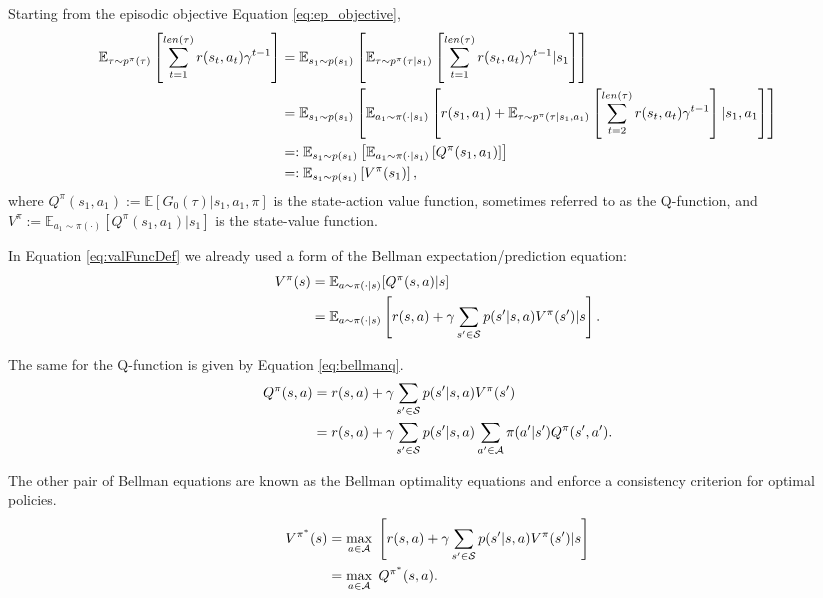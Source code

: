 \documentclass{report}
\numberwithin{equation}{section}
\numberwithin{figure}{section}
\numberwithin{table}{section}
\numberwithin{algorithm}{section}
\begin{document}
Starting from the episodic objective Equation \ref{eq:ep_objective},
\begin{align}\label{eq:valFuncDef}
  \mathbb{E}_{\tau\sim p^{\pi}(\tau)}\left[\sum_{t=1}^{len(\tau)}r(s_t, a_t)\gamma^{t-1}\right]
  &=\mathbb{E}_{s_1\sim p(s_1)}\left[\mathbb{E}_{\tau\sim p^{\pi}(\tau|s_1)}\left[\sum_{t=1}^{len(\tau)}r(s_t, a_t)\gamma^{t-1}|s_1\right]\right]\notag\\
  &=\mathbb{E}_{s_1\sim p(s_1)}\left[
      \mathbb{E}_{a_1\sim \pi(\cdot|s_1)}\left[
          r(s_1, a_1) + 
          \mathbb{E}_{\tau\sim p^{\pi}(\tau|s_1,a_1)}\left[\sum_{t=2}^{len(\tau)}r(s_t, a_t)\gamma^{t-1}\right]|s_1,a_1
        \right]
    \right]\notag\\
  &=:\mathbb{E}_{s_1\sim p(s_1)}\left[
      \mathbb{E}_{a_1\sim \pi(\cdot|s_1)}\left[Q^{\pi}(s_1,a_1)\right]
      \right]\notag\\
      &=:\mathbb{E}_{s_1\sim p(s_1)}\left[
        V^{\pi}(s_1)
      \right],
\end{align}
where $Q^{\pi}(s_1,a_1):=\mathbb{E}[G_0(\tau)|s_1, a_1, \pi]$ is the state-action value function,  
sometimes referred to as the Q-function, and $V^{\pi}:=\mathbb{E}_{a_1\sim\pi(\cdot)}[Q^{\pi}(s_1, a_1)|s_1]$ is the state-value 
function.

In Equation \ref{eq:valFuncDef} we already used a form of the Bellman expectation/prediction 
equation:
\begin{align}\label{eq:bellmanv}
  V^{\pi}(s)&=\mathbb{E}_{a\sim \pi(\cdot|s)}[Q^{\pi}(s, a)|s]\notag\\
  &=\mathbb{E}_{a\sim \pi(\cdot|s)}\left[r(s, a) + \gamma \sum_{s'\in \mathcal{S}}p(s'|s,a)V^{\pi}(s')|s\right].
\end{align}

The same for the Q-function is given by Equation \ref{eq:bellmanq}.
\begin{align}\label{eq:bellmanq}
  Q^{\pi}(s, a)&=r(s, a) + \gamma \sum_{s'\in \mathcal{S}}p(s'|s, a)V^{\pi}(s')\notag\\
  &= r(s,a) + \gamma \sum_{s'\in \mathcal{S}}p(s'|s, a)\sum_{a'\in \mathcal{A}}\pi(a'|s')Q^{\pi}(s', a').
\end{align}

The other pair of Bellman equations are known as the Bellman optimality 
equations and enforce a consistency criterion for optimal policies. 
\begin{align}\label{eq:bellmanOptV}
  V^{\pi^*}(s)&=\max_{a\in \mathcal{A}}\; \left[r(s, a) + \gamma \sum_{s'\in \mathcal{S}}p(s'|s,a)V^{\pi}(s')|s\right]\notag\\
  &=\max_{a\in \mathcal{A}}\;Q^{\pi^*}(s, a).
\end{align}
\end{document}
